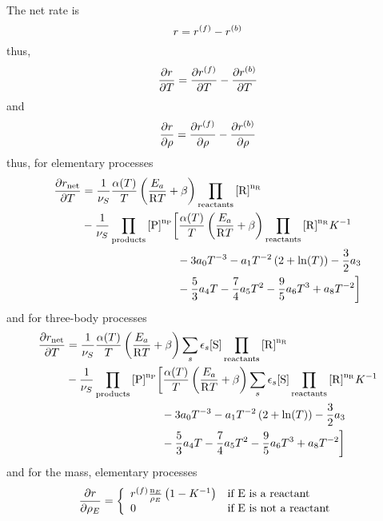 The net rate is
\begin{equation}
\rate = \fwdrate - \bkwdrate
\end{equation}
thus,
\begin{equation}
\doverdT{\rate} = \doverdT{\fwdrate} - \doverdT{\bkwdrate}
\end{equation}
and
\begin{equation}
\doverdm{\rate} = \doverdm{\fwdrate} - \doverdm{\bkwdrate}
\end{equation}
thus, for elementary processes
\begin{equation}
\begin{split}
\doverdT{\rate[{\text{net}}]} &= \frac{1}{\scoef[S]} \frac{\kinMod}{\Temp} \left(\frac{E_a}{\Rg \Temp} + \beta\right) \prodReac\\
& -
\frac{1}{\scoef[S]} \prodProd 
\bigg[
        \frac{\kinMod}{\Temp} \left(\frac{E_a}{\Rg \Temp} + \beta\right)\prodReac \Eqconst^{-1} \\
                  & \hspace{3cm} - 3\tc{0}\Temp^{-3} - \tc{1} \Temp^{-2} \left(2 + \ln(\Temp)\right) - \frac{3}{2} \tc{3} \\
                  & \hspace{3cm} - \frac{5}{3} \tc{4} \Temp - \frac{7}{4}\tc{5} \Temp^2 - \frac{9}{5}\tc{6} \Temp^3 + \tc{8} \Temp^{-2} \bigg]
\end{split}
\end{equation}
and for three-body processes
\begin{equation}
\begin{split}
\doverdT{\rate[{\text{net}}]} & = \frac{1}{\scoef[S]} \frac{\kinMod}{\Temp} \left(\frac{E_a}{\Rg \Temp} + \beta\right) \threeBody\prodReac\\
& -
\frac{1}{\scoef[S]} \prodProd 
\bigg[
        \frac{\kinMod}{\Temp} \left(\frac{E_a}{\Rg \Temp} + \beta\right)\threeBody\prodReac \Eqconst^{-1} \\
                  & \hspace{3cm} - 3\tc{0}\Temp^{-3} - \tc{1} \Temp^{-2} \left(2 + \ln(\Temp)\right) - \frac{3}{2} \tc{3} \\
                  & \hspace{3cm} - \frac{5}{3} \tc{4} \Temp - \frac{7}{4}\tc{5} \Temp^2 - \frac{9}{5}\tc{6} \Temp^3 + \tc{8} \Temp^{-2} \bigg]
\end{split}
\end{equation}
and for the mass, elementary processes
\begin{equation}
\doverdm[E]{\rate} = \left\{\begin{array}{ll}
                        \fwdrate \frac{\scoefabs[E]}{\mass[E]}\left(1-\Eqconst^{-1}\right) & \text{if \ce{E} is a reactant} \\
                          0                                                                & \text{if \ce{E} is not a reactant} \\
                      \end{array}\right.
\end{equation}
